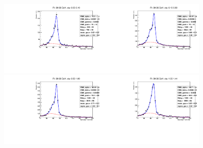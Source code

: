 \begin{figure}[htb]
  \begin{center}
   \includegraphics[width=0.45\textwidth]{../figs/figs_v11/ELECTRON_WGamma/EtoGammaFits/sa_hZmass_h_Data_EtoGamma_Enr_BARREL_pt30to35_ieta0.pdf}\includegraphics[width=0.45\textwidth]{../figs/figs_v11/ELECTRON_WGamma/EtoGammaFits/sa_hZmass_h_Data_EtoGamma_Enr_BARREL_pt30to35_ieta1.pdf}\\
   \includegraphics[width=0.45\textwidth]{../figs/figs_v11/ELECTRON_WGamma/EtoGammaFits/sa_hZmass_h_Data_EtoGamma_Enr_BARREL_pt30to35_ieta2.pdf}\includegraphics[width=0.45\textwidth]{../figs/figs_v11/ELECTRON_WGamma/EtoGammaFits/sa_hZmass_h_Data_EtoGamma_Enr_BARREL_pt30to35_ieta3.pdf}\\

\end{center}
\end{figure}
